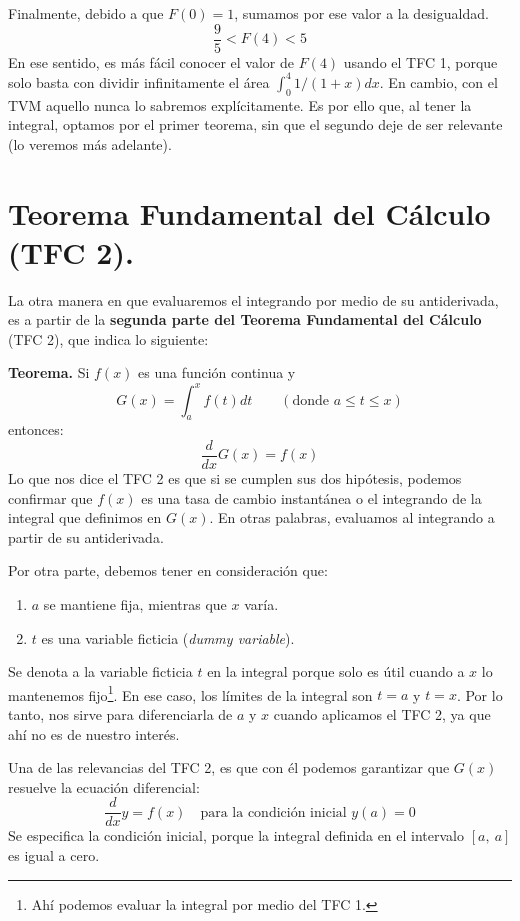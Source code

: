 \documentclass[12pt]{article}
\begin{document}
Finalmente, debido a que $F(0) = 1$, sumamos por ese valor a la desigualdad.
\[
  \frac{9}{5} < F(4) < 5
\]
En ese sentido, es más fácil conocer el valor de $F(4)$ usando el TFC 1, porque solo basta con dividir infinitamente el área $\int_{0}^{4} 1/(1 + x)dx$. En cambio, con el TVM aquello nunca lo sabremos explícitamente. Es por ello que, al tener la integral, optamos por el primer teorema, sin que el segundo deje de ser relevante (lo veremos más adelante).

\section{Teorema Fundamental del Cálculo (TFC 2).}

La otra manera en que evaluaremos el integrando por medio de su antiderivada, es a partir de la \textbf{segunda parte del Teorema Fundamental del Cálculo} (TFC 2), que indica lo siguiente:

\textbf{Teorema.} \quad Si $f(x)$ es una función continua y
\[
  G(x) = \int_{a}^{x} f(t)dt \qquad (\text{donde } a \leq t \leq x)
\]
entonces:
\[
  \frac{d}{dx}G(x) = f(x)
\]
Lo que nos dice el TFC 2 es que si se cumplen sus dos hipótesis, podemos confirmar que $f(x)$ es una tasa de cambio instantánea o el integrando de la integral que definimos en $G(x)$. En otras palabras, evaluamos al integrando a partir de su antiderivada.

Por otra parte, debemos tener en consideración que:

\begin{enumerate}
\item $a$ se mantiene fija, mientras que $x$ varía.
\item $t$ es una variable ficticia (\textit{dummy variable}).
\end{enumerate}

Se denota a la variable ficticia $t$ en la integral porque solo es útil cuando a $x$ lo mantenemos fijo\footnote{Ahí podemos evaluar la integral por medio del TFC 1.}. En ese caso, los límites de la integral son $t = a$ y $t = x$. Por lo tanto, nos sirve para diferenciarla de $a$ y $x$ cuando aplicamos el TFC 2, ya que ahí no es de nuestro interés.

Una de las relevancias del TFC 2, es que con él podemos garantizar que $G(x)$ resuelve la ecuación diferencial:
\[
  \frac{d}{dx}y = f(x) \quad \text{para la condición inicial } y(a) = 0
\]
Se especifica la condición inicial, porque la integral definida en el intervalo $[a, \ a]$ es igual a cero.
\end{document}
